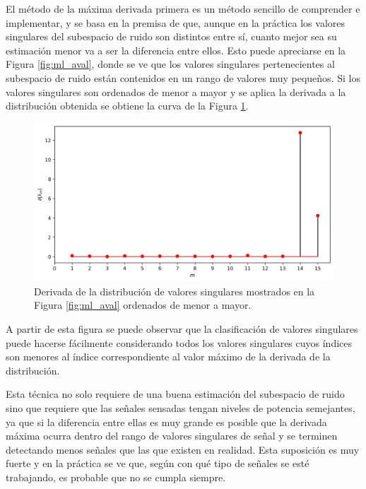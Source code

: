 El método de la máxima derivada primera es un método sencillo de comprender e implementar, y se basa en la premisa de que, aunque en la práctica los valores singulares del subespacio de ruido son distintos entre sí, cuanto mejor sea su estimación menor va a ser la diferencia entre ellos. Esto puede apreciarse en la Figura \ref{fig:ml_aval}, donde se ve que los valores singulares pertenecientes al subespacio de ruido están contenidos en un rango de valores muy pequeños. Si los valores singulares son ordenados de menor a mayor y se aplica la derivada a la distribución obtenida se obtiene la curva de la Figura \ref{fig:ml_derivada}.
\begin{figure}[ht!]
  \centering
  \includegraphics[width=0.9\linewidth]{images/05-Machine Learning/ml_derivada.png}
  \caption{Derivada de la distribución de valores singulares mostrados en la Figura \ref{fig:ml_aval} ordenados de menor a mayor.}
  \label{fig:ml_derivada}
\end{figure}
A partir de esta figura se puede observar que la clasificación de valores singulares puede hacerse fácilmente considerando todos los valores singulares cuyos índices son menores al índice correspondiente al valor máximo de la derivada de la distribución.

Esta técnica no solo requiere de una buena estimación del subespacio de ruido sino que requiere que las señales sensadas tengan niveles de potencia semejantes, ya que si la diferencia entre ellas es muy grande es posible que la derivada máxima ocurra dentro del rango de valores singulares de señal y se terminen detectando menos señales que las que existen en realidad. Esta suposición es muy fuerte y en la práctica se ve que, según con qué tipo de señales se esté trabajando, es probable que no se cumpla siempre.

